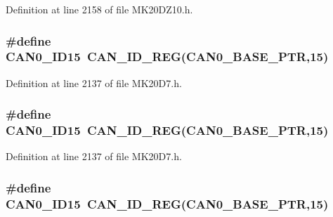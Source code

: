 Definition at line 2158 of file M\+K20\+D\+Z10.\+h.

\subsubsection[{\texorpdfstring{C\+A\+N0\+\_\+\+I\+D15}{CAN0_ID15}}]{\setlength{\rightskip}{0pt plus 5cm}\#define C\+A\+N0\+\_\+\+I\+D15~{\bf C\+A\+N\+\_\+\+I\+D\+\_\+\+R\+EG}({\bf C\+A\+N0\+\_\+\+B\+A\+S\+E\+\_\+\+P\+TR},15)}\hypertarget{group___c_a_n___register___accessor___macros_gab5d989d044753377beb76d71b7667bc5}{}\label{group___c_a_n___register___accessor___macros_gab5d989d044753377beb76d71b7667bc5}


Definition at line 2137 of file M\+K20\+D7.\+h.

\subsubsection[{\texorpdfstring{C\+A\+N0\+\_\+\+I\+D15}{CAN0_ID15}}]{\setlength{\rightskip}{0pt plus 5cm}\#define C\+A\+N0\+\_\+\+I\+D15~{\bf C\+A\+N\+\_\+\+I\+D\+\_\+\+R\+EG}({\bf C\+A\+N0\+\_\+\+B\+A\+S\+E\+\_\+\+P\+TR},15)}\hypertarget{group___c_a_n___register___accessor___macros_gab5d989d044753377beb76d71b7667bc5}{}\label{group___c_a_n___register___accessor___macros_gab5d989d044753377beb76d71b7667bc5}


Definition at line 2137 of file M\+K20\+D7.\+h.

\subsubsection[{\texorpdfstring{C\+A\+N0\+\_\+\+I\+D15}{CAN0_ID15}}]{\setlength{\rightskip}{0pt plus 5cm}\#define C\+A\+N0\+\_\+\+I\+D15~{\bf C\+A\+N\+\_\+\+I\+D\+\_\+\+R\+EG}({\bf C\+A\+N0\+\_\+\+B\+A\+S\+E\+\_\+\+P\+TR},15)}\hypertarget{group___c_a_n___register___accessor___macros_gab5d989d044753377beb76d71b7667bc5}{}\label{group___c_a_n___register___accessor___macros_gab5d989d044753377beb76d71b7667bc5}


